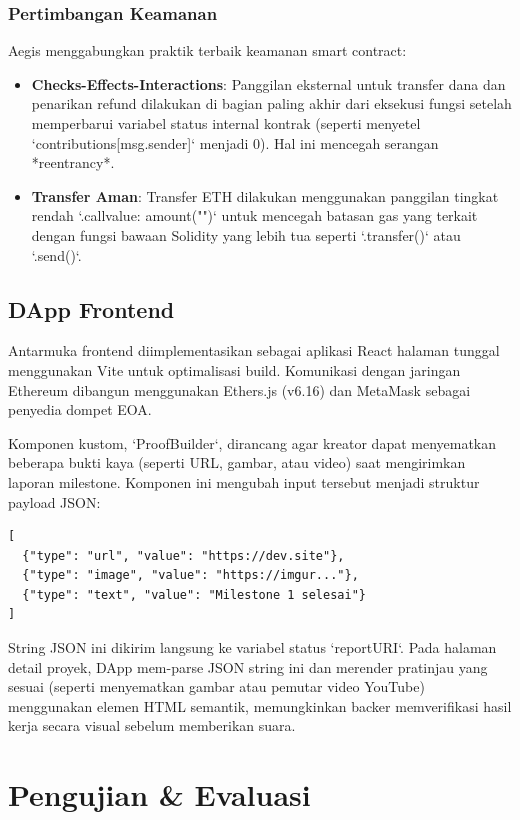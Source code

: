 \documentclass[conference]{IEEEtran}
\begin{document}
\subsubsection{Pertimbangan Keamanan}
Aegis menggabungkan praktik terbaik keamanan smart contract:
\begin{itemize}
	\item \textbf{Checks-Effects-Interactions}: Panggilan eksternal untuk transfer dana dan penarikan refund dilakukan di bagian paling akhir dari eksekusi fungsi setelah memperbarui variabel status internal kontrak (seperti menyetel `contributions[msg.sender]` menjadi 0). Hal ini mencegah serangan *reentrancy*.
	\item \textbf{Transfer Aman}: Transfer ETH dilakukan menggunakan panggilan tingkat rendah `.call{value: amount}("")` untuk mencegah batasan gas yang terkait dengan fungsi bawaan Solidity yang lebih tua seperti `.transfer()` atau `.send()`.
\end{itemize}

\subsection{DApp Frontend}
Antarmuka frontend diimplementasikan sebagai aplikasi React \cite{react} halaman tunggal menggunakan Vite \cite{vite} untuk optimalisasi build. Komunikasi dengan jaringan Ethereum dibangun menggunakan Ethers.js \cite{ethersjs} (v6.16) dan MetaMask \cite{metamask} sebagai penyedia dompet EOA.

Komponen kustom, `ProofBuilder`, dirancang agar kreator dapat menyematkan beberapa bukti kaya (seperti URL, gambar, atau video) saat mengirimkan laporan milestone. Komponen ini mengubah input tersebut menjadi struktur payload JSON:
\begin{verbatim}
[
  {"type": "url", "value": "https://dev.site"},
  {"type": "image", "value": "https://imgur..."},
  {"type": "text", "value": "Milestone 1 selesai"}
]
\end{verbatim}
String JSON ini dikirim langsung ke variabel status `reportURI`. Pada halaman detail proyek, DApp mem-parse JSON string ini dan merender pratinjau yang sesuai (seperti menyematkan gambar atau pemutar video YouTube) menggunakan elemen HTML semantik, memungkinkan backer memverifikasi hasil kerja secara visual sebelum memberikan suara.

\section{Pengujian \& Evaluasi}
\end{document}
